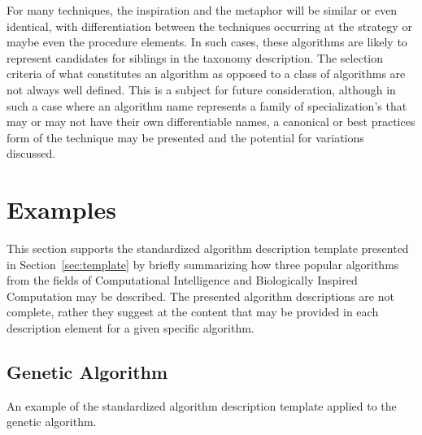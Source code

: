 \documentclass[a4paper, 11pt]{article}
\begin{document}
For many techniques, the inspiration and the metaphor will be similar or even identical, with differentiation between the techniques occurring at the strategy or maybe even the procedure elements. In such cases, these algorithms are likely to represent candidates for siblings in the taxonomy description.
The selection criteria of what constitutes an algorithm as opposed to a class of algorithms are not always well defined. This is a subject for future consideration, although in such a case where an algorithm name represents a family of specialization's that may or may not have their own differentiable names, a canonical or best practices form of the technique may be presented and the potential for variations discussed.

\section{Examples} 
\label{sec:examples}
This section supports the standardized algorithm description template presented in Section~\ref{sec:template} by briefly summarizing how three popular algorithms from the fields of Computational Intelligence and Biologically Inspired Computation may be described. The presented algorithm descriptions are not complete, rather they suggest at the content that may be provided in each description element for a given specific algorithm. 

\subsection{Genetic Algorithm}
An example of the standardized algorithm description template applied to the genetic algorithm.
\end{document}
